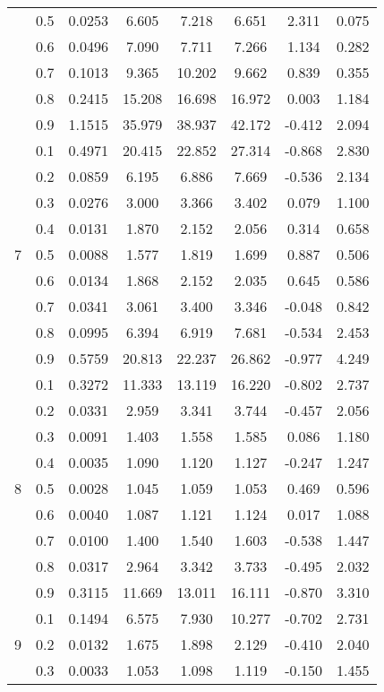 \documentclass[11pt,a4paper]{report}
\begin{document}
\begin{longtable}{ | c | c || c | c | c | c | c | c | }
 & 0.5 & 0.0253 & 6.605 & 7.218 & 6.651 & 2.311 & 0.075 \\
 & 0.6 & 0.0496 & 7.090 & 7.711 & 7.266 & 1.134 & 0.282 \\
 & 0.7 & 0.1013 & 9.365 & 10.202 & 9.662 & 0.839 & 0.355 \\
 & 0.8 & 0.2415 & 15.208 & 16.698 & 16.972 & 0.003 & 1.184 \\
 & 0.9 & 1.1515 & 35.979 & 38.937 & 42.172 & -0.412 & 2.094 \\
 \hline
\multirow{9}{*}{7} & 0.1 & 0.4971 & 20.415 & 22.852 & 27.314 & -0.868 & 2.830 \\
 & 0.2 & 0.0859 & 6.195 & 6.886 & 7.669 & -0.536 & 2.134 \\
 & 0.3 & 0.0276 & 3.000 & 3.366 & 3.402 & 0.079 & 1.100 \\
 & 0.4 & 0.0131 & 1.870 & 2.152 & 2.056 & 0.314 & 0.658 \\
 & 0.5 & 0.0088 & 1.577 & 1.819 & 1.699 & 0.887 & 0.506 \\
 & 0.6 & 0.0134 & 1.868 & 2.152 & 2.035 & 0.645 & 0.586 \\
 & 0.7 & 0.0341 & 3.061 & 3.400 & 3.346 & -0.048 & 0.842 \\
 & 0.8 & 0.0995 & 6.394 & 6.919 & 7.681 & -0.534 & 2.453 \\
 & 0.9 & 0.5759 & 20.813 & 22.237 & 26.862 & -0.977 & 4.249 \\
 \hline
\multirow{9}{*}{8} & 0.1 & 0.3272 & 11.333 & 13.119 & 16.220 & -0.802 & 2.737 \\
 & 0.2 & 0.0331 & 2.959 & 3.341 & 3.744 & -0.457 & 2.056 \\
 & 0.3 & 0.0091 & 1.403 & 1.558 & 1.585 & 0.086 & 1.180 \\
 & 0.4 & 0.0035 & 1.090 & 1.120 & 1.127 & -0.247 & 1.247 \\
 & 0.5 & 0.0028 & 1.045 & 1.059 & 1.053 & 0.469 & 0.596 \\
 & 0.6 & 0.0040 & 1.087 & 1.121 & 1.124 & 0.017 & 1.088 \\
 & 0.7 & 0.0100 & 1.400 & 1.540 & 1.603 & -0.538 & 1.447 \\
 & 0.8 & 0.0317 & 2.964 & 3.342 & 3.733 & -0.495 & 2.032 \\
 & 0.9 & 0.3115 & 11.669 & 13.011 & 16.111 & -0.870 & 3.310 \\
 \hline
\multirow{9}{*}{9} & 0.1 & 0.1494 & 6.575 & 7.930 & 10.277 & -0.702 & 2.731 \\
 & 0.2 & 0.0132 & 1.675 & 1.898 & 2.129 & -0.410 & 2.040 \\
 & 0.3 & 0.0033 & 1.053 & 1.098 & 1.119 & -0.150 & 1.455 \\

\end{longtable}
\end{document}
